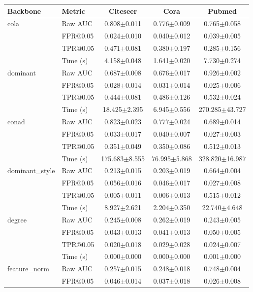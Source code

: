 \begin{tabular}{llccc}
\toprule
Backbone & Metric & Citeseer & Cora & Pubmed \\
\midrule
cola & Raw AUC & 0.808$\pm$0.011 & 0.776$\pm$0.009 & 0.765$\pm$0.058 \\
 & FPR@0.05 & 0.024$\pm$0.010 & 0.040$\pm$0.012 & 0.039$\pm$0.005 \\
 & TPR@0.05 & 0.471$\pm$0.081 & 0.380$\pm$0.197 & 0.285$\pm$0.156 \\
 & Time (s) & 4.158$\pm$0.048 & 1.641$\pm$0.020 & 7.730$\pm$0.274 \\
\midrule
dominant & Raw AUC & 0.687$\pm$0.008 & 0.676$\pm$0.017 & 0.926$\pm$0.002 \\
 & FPR@0.05 & 0.028$\pm$0.014 & 0.031$\pm$0.014 & 0.025$\pm$0.006 \\
 & TPR@0.05 & 0.444$\pm$0.081 & 0.486$\pm$0.126 & 0.532$\pm$0.024 \\
 & Time (s) & 18.425$\pm$2.395 & 6.945$\pm$0.556 & 270.285$\pm$43.727 \\
\midrule
conad & Raw AUC & 0.823$\pm$0.023 & 0.777$\pm$0.024 & 0.689$\pm$0.014 \\
 & FPR@0.05 & 0.033$\pm$0.017 & 0.040$\pm$0.007 & 0.027$\pm$0.003 \\
 & TPR@0.05 & 0.351$\pm$0.049 & 0.350$\pm$0.086 & 0.512$\pm$0.013 \\
 & Time (s) & 175.683$\pm$8.555 & 76.995$\pm$5.868 & 328.820$\pm$16.987 \\
\midrule
dominant\_style & Raw AUC & 0.213$\pm$0.015 & 0.203$\pm$0.019 & 0.664$\pm$0.004 \\
 & FPR@0.05 & 0.056$\pm$0.016 & 0.046$\pm$0.017 & 0.027$\pm$0.008 \\
 & TPR@0.05 & 0.005$\pm$0.011 & 0.006$\pm$0.013 & 0.515$\pm$0.012 \\
 & Time (s) & 8.927$\pm$2.621 & 2.204$\pm$0.350 & 22.740$\pm$4.648 \\
\midrule
degree & Raw AUC & 0.245$\pm$0.008 & 0.262$\pm$0.019 & 0.243$\pm$0.005 \\
 & FPR@0.05 & 0.043$\pm$0.013 & 0.041$\pm$0.013 & 0.050$\pm$0.005 \\
 & TPR@0.05 & 0.020$\pm$0.018 & 0.029$\pm$0.028 & 0.024$\pm$0.007 \\
 & Time (s) & 0.000$\pm$0.000 & 0.000$\pm$0.000 & 0.001$\pm$0.000 \\
\midrule
feature\_norm & Raw AUC & 0.257$\pm$0.015 & 0.248$\pm$0.018 & 0.748$\pm$0.004 \\
 & FPR@0.05 & 0.046$\pm$0.014 & 0.037$\pm$0.018 & 0.026$\pm$0.008 \\

\end{tabular}

